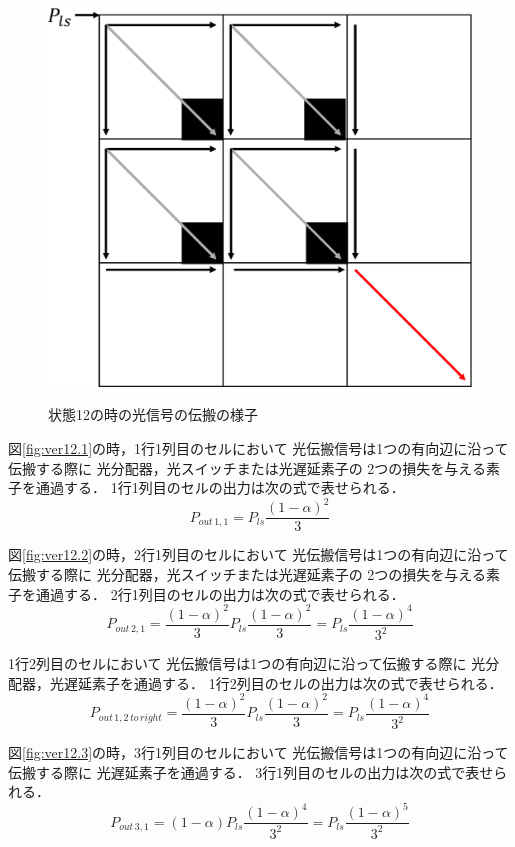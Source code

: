 \begin{itemize}
\begin{figure}[t!]
\begin{center}
{\includegraphics[keepaspectratio,scale=0.4]{fig/4/pex12.eps}
\label{fig:ver12.5}}
\caption{状態12の時の光信号の伝搬の様子}
\label{fig:ver12}
\end{center}
\end{figure}

図\ref{fig:ver12.1}の時，1行1列目のセルにおいて
光伝搬信号は1つの有向辺に沿って伝搬する際に
光分配器，光スイッチまたは光遅延素子の
2つの損失を与える素子を通過する．
1行1列目のセルの出力は次の式で表せられる． 
$$P_{out\,1,1}=P_{ls}\frac{(1-\alpha)^2}{3}$$

図\ref{fig:ver12.2}の時，2行1列目のセルにおいて
光伝搬信号は1つの有向辺に沿って伝搬する際に
光分配器，光スイッチまたは光遅延素子の
2つの損失を与える素子を通過する．
2行1列目のセルの出力は次の式で表せられる． 
$$P_{out\,2,1}=\frac{(1-\alpha)^2}{3}P_{ls}\frac{(1-\alpha)^2}{3}
=P_{ls}\frac{(1-\alpha)^4}{3^2}$$

1行2列目のセルにおいて
光伝搬信号は1つの有向辺に沿って伝搬する際に
光分配器，光遅延素子を通過する．
1行2列目のセルの出力は次の式で表せられる．
$$P_{out\,1,2\,to\,right}=\frac{(1-\alpha)^2}{3}P_{ls}\frac{(1-\alpha)^2}{3}
=P_{ls}\frac{(1-\alpha)^4}{3^2}$$

図\ref{fig:ver12.3}の時，3行1列目のセルにおいて
光伝搬信号は1つの有向辺に沿って伝搬する際に
光遅延素子を通過する．
3行1列目のセルの出力は次の式で表せられる．
$$
P_{out\,3,1}=(1-\alpha)P_{ls}\frac{(1-\alpha)^4}{3^2}=P_{ls}\frac{(1-\alpha)^5}{3^2}
$$


\end{itemize}
